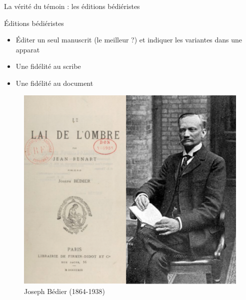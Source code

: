\documentclass[11pt]{beamer}
\begin{document}
\begin{frame}{La vérité du témoin : les éditions bédiéristes}
\begin{minipage}{.45\textwidth}
\begin{block}{Éditions bédiéristes}
\begin{itemize}
    \item Éditer un seul manuscrit (le meilleur ?) et indiquer les variantes dans une apparat
    \item Une fidélité au scribe
    \item Une fidélité au document
\end{itemize}
\end{block}
\end{minipage}
\hfill
\begin{minipage}{.5\textwidth}
    \begin{figure}
    \centering
    \includegraphics[width=1\linewidth]{img/bedier.png}
    \caption{Joseph Bédier (1864-1938)}
    \end{figure} 
\end{minipage}
\end{frame}
\end{document}
